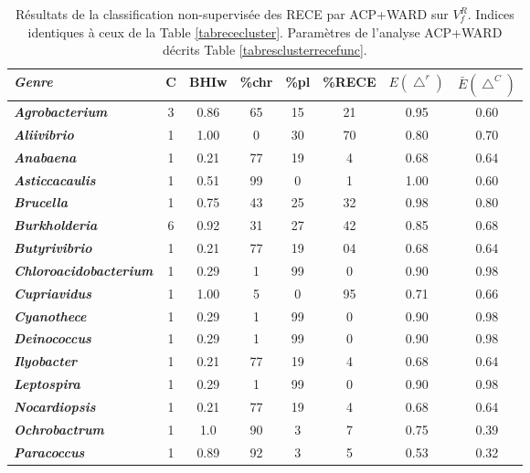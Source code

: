 \begin{table}[H]
	\begin{center}
	\caption[Résultats de la classification non-supervisée des RECE]{Résultats de la classification non-supervisée des RECE par ACP+WARD sur $V^{R}_{f}$. Indices identiques à ceux de la Table \ref{tabrececluster}. Paramètres de l'analyse ACP+WARD décrits Table \ref{tabresclusterrecefunc}.} \label{tabrecespecificfunc} 
	\small
	\begin{tabular}{>{\bfseries\itshape}l|ccccccc}
		\textbf{\textnormal{Genre}} & \textbf{C} & \textbf{\footnotesize BHIw} & \textbf{\footnotesize\%chr} & \textbf{\footnotesize\%pl} & \textbf{\scriptsize\%RECE} & $E(\bigtriangleup^{r}) $ & $\bar{E}(\bigtriangleup^{C}) $ \\
		\hline
		\textit{Agrobacterium} & 3 & 0.86 & 65 & 15 & 21 & 0.95 & 0.60 \\
		\textit{Aliivibrio} & 1 & 1.00 & 0 & 30 & 70 & 0.80 & 0.70 \\
		\rowcolor{Cchr} \textit{Anabaena} & 1 & 0.21 & 77 & 19 & 4 & 0.68 & 0.64 \\
		\rowcolor{Cchr} \textit{Asticcacaulis} & 1 & 0.51 & 99 & 0 & 1 & 1.00 & 0.60 \\
		\textit{Brucella} & 1 & 0.75 & 43 & 25 & 32 & 0.98 & 0.80 \\
		\textit{Burkholderia} & 6 & 0.92 & 31 & 27 & 42 & 0.85 & 0.68 \\
		\rowcolor{Cpl} \textit{Butyrivibrio} & 1 & 0.21 & 77 & 19 & 04 & 0.68 & 0.64 \\
		\textit{Chloroacidobacterium} & 1 & 0.29 & 1 & 99 & 0 & 0.90 & 0.98 \\
		\textit{Cupriavidus} & 1 & 1.00 & 5 & 0 & 95 & 0.71 & 0.66 \\
		\rowcolor{Cpl} \textit{Cyanothece} & 1 & 0.29 & 1 & 99 & 0 & 0.90 & 0.98 \\
		\rowcolor{Cpl} \textit{Deinococcus} & 1 & 0.29 & 1 & 99 & 0 & 0.90 & 0.98 \\
		\textit{Ilyobacter} & 1 & 0.21 & 77 & 19 & 4 & 0.68 & 0.64 \\
		\rowcolor{Cpl} \textit{Leptospira} & 1 & 0.29 & 1 & 99 & 0 & 0.90 & 0.98 \\
		\textit{Nocardiopsis} & 1 & 0.21 & 77 & 19 & 4 & 0.68 & 0.64 \\
		\textit{Ochrobactrum} & 1 & 1.0 & 90 & 3 & 7 & 0.75 & 0.39 \\
		\rowcolor{Cchr} \textit{Paracoccus} & 1 & 0.89 & 92 & 3 & 5 & 0.53 & 0.32 \\

\end{tabular}
\end{center}
\end{table}
